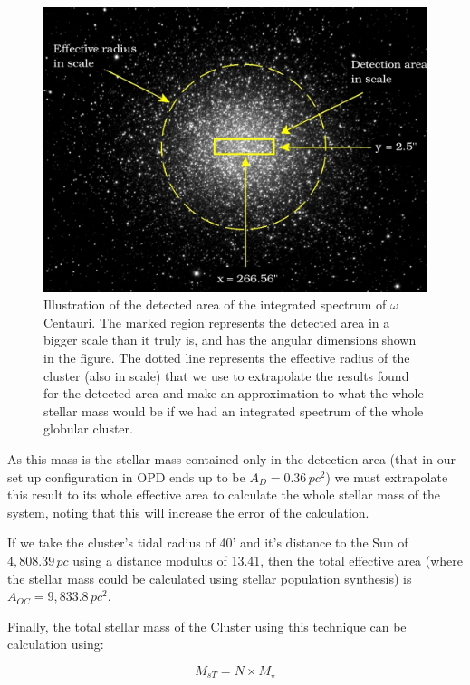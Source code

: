 \begin{figure}[H]
\centering
\includegraphics[width=12cm]{images/OmegaCentauriii.jpg}
\caption[Illustration of the detected area of the integrated spectrum]{Illustration of the detected area of the integrated spectrum of $\omega$ Centauri. The marked region represents the detected area in a bigger scale than it truly is, and has the angular dimensions shown in the figure. The dotted line represents the effective radius of the cluster (also in scale) that we use to extrapolate the results found for the detected area and make an approximation to what the whole stellar mass would be if we had an integrated spectrum of the whole globular cluster.}
\end{figure}

As this mass is the stellar mass contained only in the detection area (that in our set up configuration in OPD ends up to be $A_{D}=0.36\,pc^{2}$) we must extrapolate this result to its whole effective area to calculate the whole stellar mass of the system, noting that this will increase the error of the calculation.

If we take the cluster's tidal radius of 40' and it's distance to the Sun of $4,808.39\,pc$ using a distance modulus of 13.41, then the total effective area (where the stellar mass could be calculated using stellar population synthesis) is $A_{OC}=9,833.8\,pc^{2}$. 

Finally, the total stellar mass of the Cluster using this technique can be calculation using:

\begin{equation}
M_{s T} = N \times M_{\star}
\end{equation}

